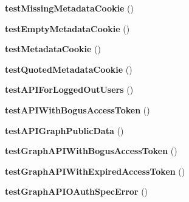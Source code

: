 \begin{DoxyCompactItemize}
\item 
\hypertarget{classPHPSDKTestCase_ab5b8301e4766c1b84f3656b1bb4d3781}{{\bfseries test\-Missing\-Metadata\-Cookie} ()}\label{classPHPSDKTestCase_ab5b8301e4766c1b84f3656b1bb4d3781}

\item 
\hypertarget{classPHPSDKTestCase_ab638a3a7b8a630ff81e8119694cd78fe}{{\bfseries test\-Empty\-Metadata\-Cookie} ()}\label{classPHPSDKTestCase_ab638a3a7b8a630ff81e8119694cd78fe}

\item 
\hypertarget{classPHPSDKTestCase_aff1c5184464e6eafa6ffa811d24539b7}{{\bfseries test\-Metadata\-Cookie} ()}\label{classPHPSDKTestCase_aff1c5184464e6eafa6ffa811d24539b7}

\item 
\hypertarget{classPHPSDKTestCase_a23d3902f5f50998fa0963618f3942445}{{\bfseries test\-Quoted\-Metadata\-Cookie} ()}\label{classPHPSDKTestCase_a23d3902f5f50998fa0963618f3942445}

\item 
\hypertarget{classPHPSDKTestCase_ae39fae1698553f22d1d3578e3fd65fe4}{{\bfseries test\-A\-P\-I\-For\-Logged\-Out\-Users} ()}\label{classPHPSDKTestCase_ae39fae1698553f22d1d3578e3fd65fe4}

\item 
\hypertarget{classPHPSDKTestCase_ad3601d19bf8605484a05fc6a13448a88}{{\bfseries test\-A\-P\-I\-With\-Bogus\-Access\-Token} ()}\label{classPHPSDKTestCase_ad3601d19bf8605484a05fc6a13448a88}

\item 
\hypertarget{classPHPSDKTestCase_af914365520eea1c8ac00a5c639f4debe}{{\bfseries test\-A\-P\-I\-Graph\-Public\-Data} ()}\label{classPHPSDKTestCase_af914365520eea1c8ac00a5c639f4debe}

\item 
\hypertarget{classPHPSDKTestCase_aee5c1c6a4b3ffcaea890f52fbf977926}{{\bfseries test\-Graph\-A\-P\-I\-With\-Bogus\-Access\-Token} ()}\label{classPHPSDKTestCase_aee5c1c6a4b3ffcaea890f52fbf977926}

\item 
\hypertarget{classPHPSDKTestCase_a41f5ef1c40ecf17ea21ffe8540589191}{{\bfseries test\-Graph\-A\-P\-I\-With\-Expired\-Access\-Token} ()}\label{classPHPSDKTestCase_a41f5ef1c40ecf17ea21ffe8540589191}

\item 
\hypertarget{classPHPSDKTestCase_ad231125c22ba65ebaf70ccb5dfb92fed}{{\bfseries test\-Graph\-A\-P\-I\-O\-Auth\-Spec\-Error} ()}\label{classPHPSDKTestCase_ad231125c22ba65ebaf70ccb5dfb92fed}


\end{DoxyCompactItemize}
